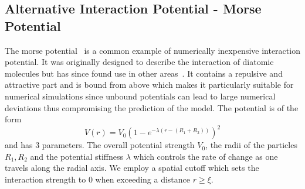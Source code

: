 \documentclass{article}
\begin{document}
\subsection{Alternative Interaction Potential - Morse Potential}
The morse potential~\cite{Morse1929} is a common example of numerically inexpensive interaction
potential.
It was originally designed to describe the interaction of diatomic molecules but has since found use
in other areas~\cite{Breitwieser2021}.
It contains a repulsive and attractive part and is bound from above which makes it particularly
suitable for numerical simulations since unbound potentials can lead to large numerical deviations
thus compromising the prediction of the model.
The potential is of the form
\begin{equation}
    V(r) = V_0\left(1-e^{-\lambda(r-(R_1+R_2))}\right)^2
\end{equation}
and has 3 parameters.
The overall potential strength $V_0$, the radii of the particles $R_1,R_2$ and the potential
stiffness $\lambda$ which controls the rate of change as one travels along the radial axis.
We employ a spatial cutoff which sets the interaction strength to $0$ when exceeding a distance
$r\geq\xi$.


\end{document}
